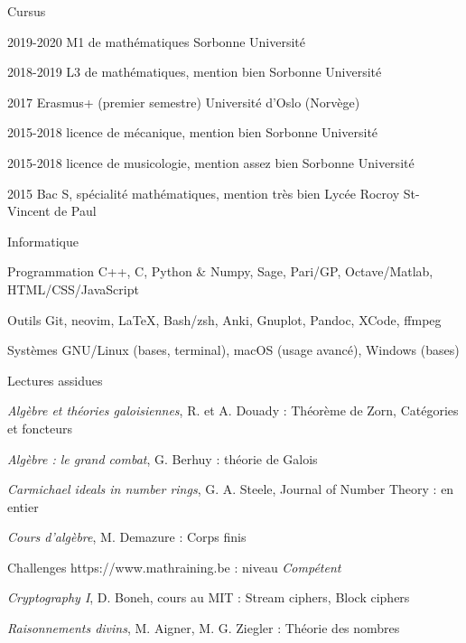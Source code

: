 \documentclass{LoLaTeXcv}
\begin{document}


\begin{lltxHistory}{Cursus}
	\item[2019-2020] M1 de mathématiques \lltxdotfill Sorbonne Université
	\item[2018-2019] L3 de mathématiques, mention bien \lltxdotfill Sorbonne Université
	\item[2017] Erasmus+ (premier semestre) \lltxdotfill Université d'Oslo (Norvège)
	\item[2015-2018] licence de mécanique, mention bien \lltxdotfill Sorbonne Université
	\item[2015-2018] licence de musicologie, mention assez bien \lltxdotfill Sorbonne Université
	\item[2015] Bac S, spécialité mathématiques, mention très bien \lltxdotfill Lycée Rocroy St-Vincent de Paul
\end{lltxHistory}


\begin{lltxHistory}{Informatique}
	\item[Programmation]C++, C, Python \& Numpy, Sage, Pari/GP, Octave/Matlab, HTML/CSS/JavaScript
	\item[Outils]Git, neovim, \LaTeX, Bash/zsh, Anki, Gnuplot, Pandoc, XCode, ffmpeg
	\item[Systèmes]GNU/Linux (bases, terminal), macOS (usage avancé), Windows (bases)
\end{lltxHistory}


\begin{lltxItemize}{Lectures assidues}
	\item{\textit{Algèbre et théories galoisiennes}, R. et A. Douady : Théorème de Zorn, Catégories et foncteurs}
	\item{\textit{Algèbre : le grand combat}, G. Berhuy : théorie de Galois}
	\item{\textit{Carmichael ideals in number rings}, G. A. Steele, Journal of Number Theory : en entier}
	\item{\textit{Cours d'algèbre}, M. Demazure : Corps finis}
	\item{Challenges https://www.mathraining.be : niveau \textit{Compétent}}
	\item{\textit{Cryptography I}, D. Boneh, cours au MIT : Stream ciphers, Block ciphers}
	\item{\textit{Raisonnements divins}, M. Aigner, M. G. Ziegler : Théorie des nombres}
\end{lltxItemize}


\end{document}
